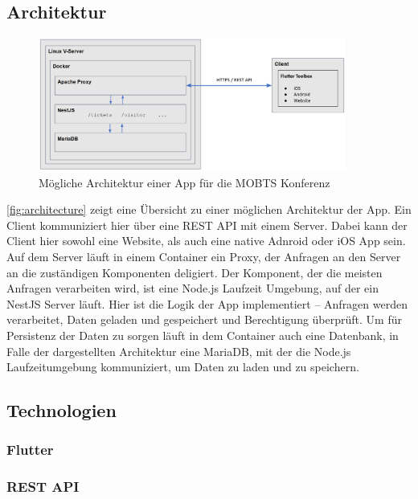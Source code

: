 \subsection{Architektur}
\begin{figure}[h]
    \begin{center}
        \includegraphics[width=0.9\textwidth]{img/app_architecture.PNG}
    \end{center}
    \caption{Mögliche Architektur einer App für die MOBTS Konferenz}
    \label{fig:architecture}
\end{figure}

\autoref{fig:architecture} zeigt eine Übersicht zu einer möglichen Architektur der App.
Ein Client kommuniziert hier über eine \ac{REST} \ac{API} mit einem Server.
Dabei kann der Client hier sowohl eine Website, als auch eine native Adnroid oder iOS App sein.
Auf dem Server läuft in einem Container ein Proxy, der Anfragen an den Server an die zuständigen Komponenten deligiert.
Der Komponent, der die meisten Anfragen verarbeiten wird, ist eine Node.js Laufzeit Umgebung, auf der ein NestJS Server läuft.
Hier ist die Logik der App implementiert -- Anfragen werden verarbeitet, Daten geladen und gespeichert und Berechtigung überprüft.
Um für Persistenz der Daten zu sorgen läuft in dem Container auch eine Datenbank, in Falle der dargestellten Architektur eine MariaDB, mit der die Node.js Laufzeitumgebung kommuniziert, um Daten zu laden und zu speichern.

\subsection{Technologien}
\subsubsection*{Flutter}

\subsubsection*{\ac{REST} \ac{API}}

